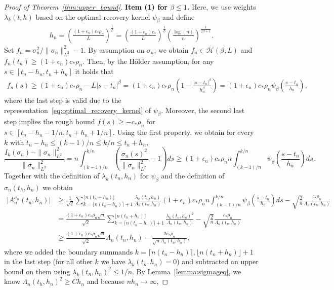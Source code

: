 \documentclass[10.5pt,letter]{article}
\numberwithin{equation}{section}
\theoremstyle{definition}
\newcommand{\1}{\mathbbm{1}}
\begin{document}
\begin{proof}[Proof of Theorem~\ref{thm:upper_bound}]
\textbf{Item (1) for $\beta\leq 1$.} Here, we use weights $\lambda_k(t,h)$ based on the optimal recovery kernel $\psi_\beta$ and define
\begin{align}\label{eq:h_detect}
    h_n = \left(\frac{(1+\epsilon_n)c_*\rho_n}{L}\right)^{\frac{1}{\beta}}= \left(\frac{(1+\epsilon_n)c_*}{L}\right)^{\frac{1}{\beta}} \left( \frac{\log(n)}{n}\right)^{\frac{1}{2\beta+1}}.
\end{align} 
Set $f_n=\sigma_n^2/\|\sigma_n\|_{L^2}^2-1$. By assumption on $\sigma_n$, we obtain $f_n\in\mathcal{H}(\beta,L)$ and $f_n(t_n)\geq (1+\epsilon_n)c_*\rho_n$. Then, by the Hölder assumption, for any $s\in [t_n-h_n, t_n+h_n]$ it holds that
\begin{align*}
    f_n(s) \geq (1+\epsilon_n)c_*\rho_n-L|s-t_n|^\beta = (1+\epsilon_n)c_*\rho_n \left( 1-\frac{|s-t_n|^\beta}{h_n^\beta}\right) = (1+\epsilon_n)c_*\rho_n\psi_\beta\left(\frac{s-t_n}{h_n}\right),
\end{align*}
where the last step is valid due to the representation~\eqref{eq:optimal_recovery_kernel} of $\psi_\beta$. Moreover, the second last step implies the rough bound $f(s)\geq -c_*\rho_n$ for $s\in [t_n-h_n-1/n,t_n+h_n+1/n]$. Using the first property, we obtain for every $k$ with $t_n-h_n\leq (k-1)/n \leq k/n\leq t_n+h_n$,
\[ \frac{I_k(\sigma_n) -\|\sigma_n\|_{L^2}^2}{\|\sigma_n\|_{L^2}^2} = n\int_{(k-1)/n}^{k/n} \left( \frac{\sigma_n(s)^2}{\|\sigma_n\|_{L^2}^2} -1\right) ds \geq (1+\epsilon_n)c_*\rho_n n\int_{(k-1)/n}^{k/n} \psi_\beta\left(\frac{s-t_n}{h_n}\right) ds.\]
Together with the definition of $\lambda_k(t_n,h_n)$ for $\psi_\beta$ and the definition of $\sigma_n(t_h,h_n)$ we obtain
\begin{align*}
    \big|A_n^{\sigma_n}(t_n,h_n)\big| &\geq \frac{1}{\sqrt{2}}\sum_{k=\lceil n(t_n-h_n)\rceil+1}^{\lfloor n(t_n+h_n)\rfloor} \frac{\lambda_k(t_n,h_n)}{\Lambda_n(t_n,h_n)} (1+\epsilon_n)c_*\rho_n n\int_{(k-1)/n}^{k/n} \psi_\beta\left( \frac{s-t_n}{h_n}\right) ds - \sqrt{\frac{2}{n}}\frac{c_*\rho_n}{\Lambda_n(t_n,h_n)} \\
    &= \frac{(1+\epsilon_n)c_*\rho_n \sqrt{n}}{\sqrt{2}} \sum_{k=\lceil n(t_n-h_n)\rceil +1}^{\lfloor n(t_n+h_n)\rfloor} \frac{\lambda_k(t_n,h_n)^2}{\Lambda_n(t_n,h_n)}- \sqrt{\frac{2}{n}}\frac{c_*\rho_n}{\Lambda_n(t_n,h_n)} \\
    &\geq \frac{(1+\epsilon_n)c_*\rho_n \sqrt{n}}{\sqrt{2}}\Lambda_n(t_n,h_n) - \frac{2c_*\rho_n}{\sqrt{n}\Lambda_n(t_n,h_n)},
\end{align*}
where we added the boundary summands $k=\lceil n(t_n-h_n)\rceil, \lfloor n(t_n+h_n)\rfloor +1$ in the last step (for all other $k$ we have $\lambda_k(t_n,h_n)=0$) and subtracted an upper bound on them using $\lambda_k(t_n,h_n)^2\leq 1/n$. By Lemma~\ref{lemma:sigmageq}, we know $\Lambda_n(t_h,h_n)^2\geq Ch_n$ and because $nh_n\to\infty$,

\end{proof}
\end{document}
